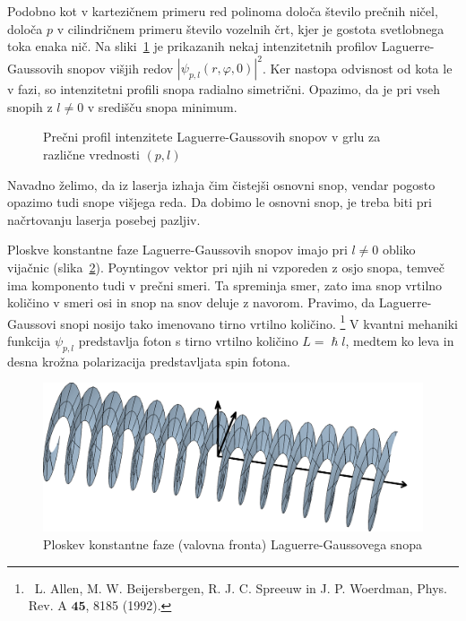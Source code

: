 Podobno kot v kartezičnem primeru red polinoma določa število prečnih ničel,
določa $p$ v cilindričnem primeru število vozelnih črt, kjer je gostota 
svetlobnega toka enaka nič. Na sliki~\ref{fig:Laguerrovi_presek}
je prikazanih nekaj intenzitetnih profilov Laguerre-Gaussovih snopov
višjih redov $|\psi_{p,l}(r, \varphi, 0)|^2$. Ker nastopa  odvisnost od kota
le v fazi, so intenzitetni profili snopa radialno simetrični. Opazimo, da je pri  
vseh snopih z $l \ne 0$ v središču snopa minimum. 
\begin{figure}[ht]
\centering
\def\svgwidth{100truemm} 

\caption{Prečni profil intenzitete Laguerre-Gaussovih snopov v grlu 
za različne vrednosti $(p,l)$}
\label{fig:Laguerrovi_presek}
\end{figure}

Navadno želimo, da iz laserja izhaja čim čistejši osnovni snop, vendar
pogosto opazimo tudi snope višjega reda. Da dobimo le osnovni
snop, je treba biti pri načrtovanju laserja posebej pazljiv. 

\begin{remark}
Ploskve konstantne faze Laguerre-Gaussovih snopov imajo pri $l\ne0$  obliko 
vijačnic (slika~\ref{fig:Laguerrova_fronta}). 
Poyntingov vektor 
pri njih ni vzporeden z osjo snopa, temveč ima komponento tudi v prečni smeri. Ta spreminja smer, 
zato ima snop vrtilno količino v smeri osi in snop na snov deluje z navorom. 
Pravimo, da Laguerre-Gaussovi snopi nosijo tako imenovano tirno vrtilno 
količino.
\footnote{~L. Allen, M. W. Beijersbergen, R. J. C. Spreeuw in 
J. P. Woerdman, Phys. Rev. A $\mathbf{45}$, 8185 (1992).}
V kvantni mehaniki funkcija $\psi_{p,l}$ predstavlja foton s tirno vrtilno količino $L = \hslash l$, 
medtem ko leva in desna krožna polarizacija predstavljata spin fotona. 
\begin{figure}[ht]
\centering
\includegraphics[width=10truecm]{slike/03_Laguerre_faza.png}
\caption{Ploskev konstantne faze (valovna fronta) Laguerre-Gaussovega snopa}
\label{fig:Laguerrova_fronta}
\end{figure}
\end{remark}

